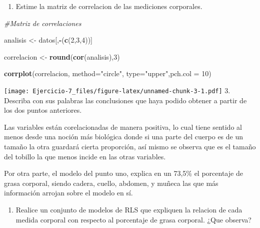 \documentclass[
]{article}
\newenvironment{Shaded}{\begin{snugshade}}{\end{snugshade}}
\newcommand{\AttributeTok}[1]{\textcolor[rgb]{0.13,0.29,0.53}{#1}}
\newcommand{\CommentTok}[1]{\textcolor[rgb]{0.56,0.35,0.01}{\textit{#1}}}
\newcommand{\DecValTok}[1]{\textcolor[rgb]{0.00,0.00,0.81}{#1}}
\newcommand{\FunctionTok}[1]{\textcolor[rgb]{0.13,0.29,0.53}{\textbf{#1}}}
\newcommand{\NormalTok}[1]{#1}
\newcommand{\OtherTok}[1]{\textcolor[rgb]{0.56,0.35,0.01}{#1}}
\newcommand{\SpecialCharTok}[1]{\textcolor[rgb]{0.81,0.36,0.00}{\textbf{#1}}}
\newcommand{\StringTok}[1]{\textcolor[rgb]{0.31,0.60,0.02}{#1}}
\providecommand{\tightlist}{%
  \setlength{\itemsep}{0pt}\setlength{\parskip}{0pt}}
\begin{document}
\begin{enumerate}
\def\labelenumi{\arabic{enumi}.}
\setcounter{enumi}{1}
\tightlist
\item
  Estime la matriz de correlacion de las mediciones corporales.
\end{enumerate}

\begin{Shaded}
\begin{Highlighting}[]
\CommentTok{\#Matriz de correlaciones}



\NormalTok{analisis }\OtherTok{\textless{}{-}}\NormalTok{ datos[,}\SpecialCharTok{{-}}\NormalTok{(}\FunctionTok{c}\NormalTok{(}\DecValTok{2}\NormalTok{,}\DecValTok{3}\NormalTok{,}\DecValTok{4}\NormalTok{))]}


\NormalTok{correlacion }\OtherTok{\textless{}{-}} \FunctionTok{round}\NormalTok{(}\FunctionTok{cor}\NormalTok{(analisis),}\DecValTok{3}\NormalTok{)}

\FunctionTok{corrplot}\NormalTok{(correlacion, }\AttributeTok{method=}\StringTok{"circle"}\NormalTok{, }\AttributeTok{type=}\StringTok{"upper"}\NormalTok{,}\AttributeTok{pch.col =} \DecValTok{10}\NormalTok{)}
\end{Highlighting}
\end{Shaded}

\texttt{[image: Ejercicio-7\_files/figure-latex/unnamed-chunk-3-1.pdf]}
3. Describa con sus palabras las conclusiones que haya podido obtener a
partir de los dos puntos anteriores.

Las variables están corelacionadas de manera positiva, lo cual tiene
sentido al menos desde una noción más biológica donde si una parte del
cuerpo es de un tamaño la otra guardará cierta proporción, así mismo se
observa que es el tamaño del tobillo la que menos incide en las otras
variables.

Por otra parte, el modelo del punto uno, explica en un 73,5\% el
porcentaje de grasa corporal, siendo cadera, cuello, abdomen, y muñeca
las que más información arrojan sobre el modelo en sí.

\begin{enumerate}
\def\labelenumi{\arabic{enumi}.}
\setcounter{enumi}{3}
\tightlist
\item
  Realice un conjunto de modelos de RLS que expliquen la relacion de
  cada medida corporal con respecto al porcentaje de grasa corporal.
  ¿Que observa?
\end{enumerate}
\end{document}

